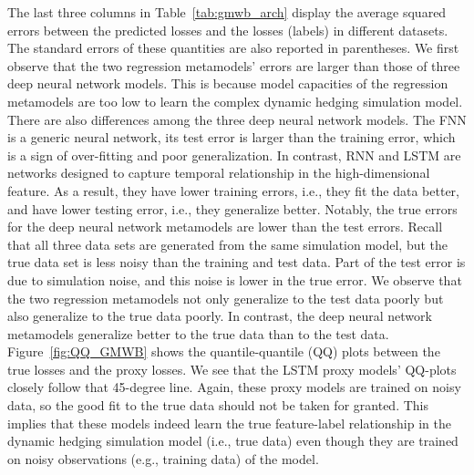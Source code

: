 \documentclass{article}
\begin{document}
The last three columns in Table~\ref{tab:gmwb_arch} display the average squared errors between the predicted losses and the losses (labels) in different datasets.
The standard errors of these quantities are also reported in parentheses.
We first observe that the two regression metamodels' errors are larger than those of three deep neural network models.
This is because model capacities of the regression metamodels are too low to learn the complex dynamic hedging simulation model.
There are also differences among the three deep neural network models.
The FNN is a generic neural network, its test error is larger than the training error, which is a sign of over-fitting and poor generalization.
In contrast, RNN and LSTM are networks designed to capture temporal relationship in the high-dimensional feature.
As a result, they have lower training errors, i.e., they fit the data better, and have lower testing error, i.e., they generalize better.
Notably, the true errors for the deep neural network metamodels are lower than the test errors.
Recall that all three data sets are generated from the same simulation model, but the true data set is less noisy than the training and test data.
Part of the test error is due to simulation noise, and this noise is lower in the true error.
We observe that the two regression metamodels not only generalize to the test data poorly but also generalize to the true data poorly.
In contrast, the deep neural network metamodels generalize better to the true data than to the test data.
Figure~\ref{fig:QQ_GMWB} shows the quantile-quantile (QQ) plots between the true losses and the proxy losses.
We see that the LSTM proxy models' QQ-plots closely follow that 45-degree line.
Again, these proxy models are trained on noisy data, so the good fit to the true data should not be taken for granted.
This implies that these models indeed learn the true feature-label relationship in the dynamic hedging simulation model (i.e., true data) even though they are trained on noisy observations (e.g., training data) of the model.
\end{document}

